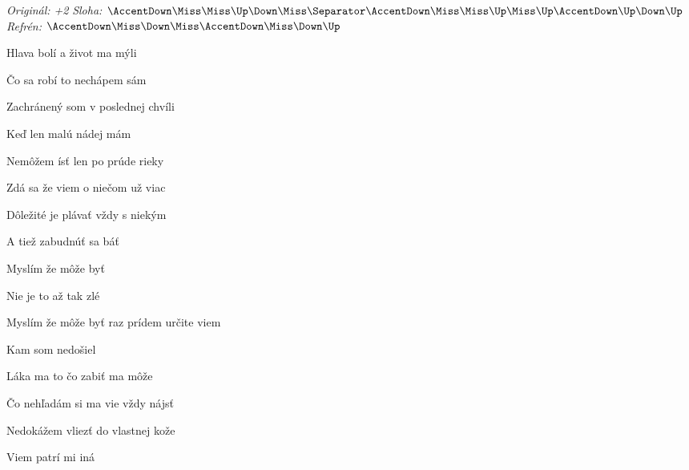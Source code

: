\begin{song}


\begin{headerbox}
\RaiseBoxWithAccents
\textit{Originál: +2} \quad
\textit{Sloha:} $\AccentDown\Miss\Miss\Up\Down\Miss \Separator \AccentDown\Miss\Miss\Up\Miss\Up\AccentDown\Up\Down\Up$ \quad
\textit{Refrén:} $\AccentDown\Miss\Down\Miss\AccentDown\Miss\Down\Up$
\end{headerbox}

\begin{hchordbox}
\end{hchordbox}

\Large

\bigskip

Hlava bolí a život ma mýli \par
{}Čo sa robí to nechápem sám \par
{}Zachránený som v poslednej chvíli \par
Keď len malú nádej mám \par

\bigskip

Nemôžem ísť len po prúde rieky \par
{}Zdá sa že viem o niečom už viac \par
{}Dôležité je plávať vždy s niekým \par
A tiež zabudnúť sa báť \par

\bigskip

\begin{chorusbox}{\Refren}
Myslím že môže byť   \par
Nie je to až tak zlé    \par
Myslím že môže byť  raz prídem určite viem \par
Kam som nedošiel \par
\end{chorusbox}

\bigskip

Láka ma to čo zabiť ma môže \par
{}Čo nehľadám si ma vie vždy nájsť \par
{}Nedokážem vliezť do vlastnej kože \par
{}Viem patrí mi iná \par


\end{song}
